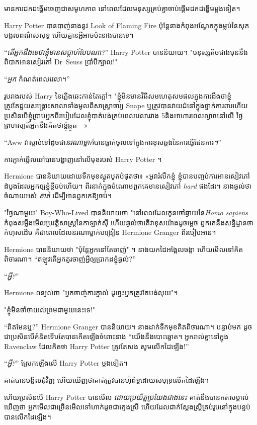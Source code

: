 {មានការដកដង្ហើមចេញជាសមូហភាព នៅពេលដែលមនុស្សគ្រប់គ្នាចាប់ផ្តើមដកដង្ហើមម្តងទៀត។

Harry Potter បានបាញ់នាងនូវ Look of Flaming Fire ប៉ុន្តែនាងកំពុងអណ្តែតក្នុងម្លប់នៃសុភមង្គលពណ៌សសុទ្ធ ហើយគ្មានអ្វីអាចប៉ះនាងបានទេ។

“\emph{តើអ្នកដឹងទេថាខ្ញុំមានសប្តាហ៍បែបណា?}” Harry Potter បាននិយាយ។ "មនុស្សតិចជាងមុននឹងពិបាកអានសៀវភៅ Dr~Seuss ប្រាំបីក្បាល!"

“\emph{អ្នក} កំណត់ពេលវេលា។”

រូបរាងរបស់ Harry នៃភ្លើងឆេះកាន់តែក្តៅ។ "ខ្ញុំមិនមានវិធីសមហេតុសមផលក្នុងការដឹងថាខ្ញុំត្រូវតែជួយសង្គ្រោះសាលាទាំងមូលពីសាស្រ្តាចារ្យ Snape ឬត្រូវបានវាយដំនៅក្នុងថ្នាក់ការពារហើយប្រសិនបើខ្ញុំប្រាប់អ្នកពីរបៀបដែលខ្ញុំបាត់បង់គ្រប់ពេលវេលារវាង 5\pm និងអាហារពេលល្ងាចនៅលើ ថ្ងៃ​ព្រហស្បតិ៍​អ្នក​នឹង​គិត​ថា​ខ្ញុំ​ឆ្កួត—»

“Aww វាស្តាប់ទៅដូចជា\emph{នរណាម្នាក់}បានធ្លាក់ចូលទៅក្នុងការខុសឆ្គងនៃការធ្វើផែនការ\emph។”

ការភ្ញាក់ផ្អើលឆៅបានបង្ហាញនៅលើមុខរបស់ Harry Potter ។

Hermione បាន​និយាយ​ដោយ​ទឹកមុខ​ស្លូតបូត​បំផុត​ថា៖ «អូ​វា​រំលឹក​ខ្ញុំ ខ្ញុំ​បាន​បញ្ចប់​ការ​អាន​សៀវភៅ​ដំបូង​ដែល​អ្នក​ឲ្យ​ខ្ញុំ​ខ្ចី​ចប់​ហើយ។ ពីរ​នាក់​ក្នុង​ចំណោម​ពួក​គេ​មាន​សៀវភៅ \emph{hard} ផង​ដែរ។ នាង​ឆ្ងល់​ថា​ចំណាយ​អស់ \emph{គាត់} ដើម្បី​អាន​ពួក​គេ​ឱ្យ​ចប់។

"ថ្ងៃណាមួយ" Boy-Who-Lived បាននិយាយថា "នៅពេលដែលកូនចៅឆ្ងាយនៃ\emph{Homo sapiens} កំពុងសម្លឹងមើលប្រវត្តិសាស្រ្តនៃកាឡាក់ស៊ី ហើយឆ្ងល់ថាតើវាខុសយ៉ាងដូចម្ដេច ពួកគេនឹងសន្និដ្ឋានថាកំហុសដើម គឺជាពេលដែលនរណាម្នាក់បង្រៀន Hermione Granger ពីរបៀបអាន។

Hermione បាននិយាយថា "ប៉ុន្តែអ្នកនៅតែចាញ់" ។ នាង​យក​ដៃ​អង្អែល​ចង្កា ហើយ​មើល​ទៅ​គិត​ពិចារណា។ “ឥឡូវ​តើ​អ្នក​គួរ​ចាញ់​អ្វី​ឲ្យ​ប្រាកដ​ខ្ញុំ​ឆ្ងល់?”

“\emph{អ្វី?}”

Hermione ពន្យល់ថា "អ្នកចាញ់ការភ្នាល់ ដូច្នេះអ្នកត្រូវតែបង់លុយ"។

"ខ្ញុំមិនចាំថាយល់ព្រមជាមួយនេះទេ!"

“ពិតមែនឬ?” Hermione Granger បាននិយាយ។ នាង​ដាក់​ទឹក​មុខ​គិត​ពិចារណា។ បន្ទាប់មក ដូចជាប្រសិនបើគំនិតទើបតែបានកើតឡើងចំពោះនាង “យើងនឹងបោះឆ្នោត។ អ្នករាល់គ្នានៅក្នុង Ravenclaw ដែលគិតថា Harry Potter ត្រូវតែសង សូមលើកដៃឡើង!”

“\emph{អ្វី?}” ស្រែក​ឡើង​លើ Harry Potter ម្ដងទៀត។

គាត់បានបង្វិលជុំវិញ ហើយឃើញថាគាត់ត្រូវបានហ៊ុំព័ទ្ធដោយសមុទ្រលើកដៃឡើង។

ហើយប្រសិនបើ Harry Potter បានមើល \emph{ដោយប្រយ័ត្នប្រយែងជាងនេះ} គាត់នឹងបានកត់សម្គាល់ឃើញថា អ្នកមើលជាច្រើនមើលទៅហាក់ដូចជាក្មេងស្រី ហើយដែលជាក់ស្តែងស្ត្រីគ្រប់រូបនៅក្នុងបន្ទប់បានលើកដៃឡើង។

}
